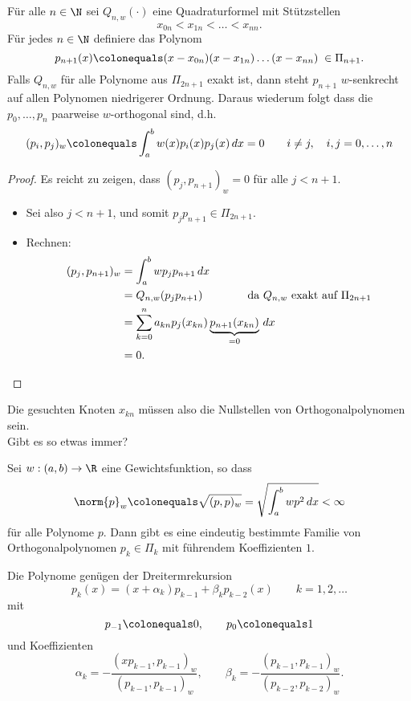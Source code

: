 \begin{lemma}
Für alle $n \in \N$ sei $Q_{n,w} (\cdot)$ eine Quadraturformel mit Stützstellen
\begin{equation*}
x_{0n} < x_{1n} < \dots < x_{nn}.
\end{equation*}
Für jedes $n \in \N$ definiere das Polynom
\begin{equation*}
p_{n+1}(x) \colonequals (x-x_{0n}) (x-x_{1n}) \dots (x-x_{nn}) \; \in \Pi_{n+1}.
\end{equation*}
Falls $Q_{n,w}$ für alle Polynome aus $\Pi_{2n+1}$ exakt ist, dann steht $p_{n+1}$
$w$-senkrecht auf allen Polynomen niedrigerer Ordnung.  Daraus wiederum folgt
dass  die $p_0, \dots, p_n$ paarweise $w$-orthogonal sind, d.h.
\begin{equation*}
(p_i,p_j)_w \colonequals \int_a^b w(x) p_i(x) p_j(x) \,dx = 0
\qquad
i \neq j, \quad  i,j = 0, \dots, n
\end{equation*}
\end{lemma}
\begin{proof}
Es reicht zu zeigen, dass $(p_j, p_{n+1})_w = 0$ für alle $j < n+1$.
\begin{itemize}
\item Sei also $j<n+1$, und somit $p_j p_{n+1} \in \Pi_{2n+1}$.
\item Rechnen:
\begin{align*}
(p_j, p_{n+1})_w
 & = \int_a^b w p_j p_{n+1}\,dx \\
 & = Q_{n,w} (p_j p_{n+1}) \qquad \qquad \textnormal{da $Q_{n,w}$ exakt auf $\Pi_{2n+1}$} \\
 & = \sum_{k=0}^n a_{kn}p_j(x_{kn})\underbrace{p_{n+1}(x_{kn})}_{= 0} \, dx \\
 & = 0.  \qedhere
\end{align*}
\end{itemize}
\end{proof}
Die gesuchten Knoten $x_{kn}$ müssen also die Nullstellen von Orthogonalpolynomen sein.
\\Gibt es so etwas immer?
\begin{satz}
Sei $w: (a,b) \to \R$ eine Gewichtsfunktion, so dass
\begin{equation*}
 \norm{p}_w
 \colonequals
 \sqrt{(p,p)_w}
 =
 \sqrt{ \int_a^b w p^2 \, dx} < \infty
\end{equation*}
für alle Polynome $p$. Dann gibt es eine eindeutig bestimmte Familie von Orthogonalpolynomen $p_k \in \Pi_k$ mit führendem Koeffizienten $1$.

Die Polynome genügen der Dreitermrekursion
\begin{equation*}
p_k(x) = (x + \alpha_k) p_{k-1} + \beta_k p_{k-2}(x) \qquad k = 1,2,\dots
\end{equation*}
mit
\begin{equation*}
p_{-1} \colonequals 0, \qquad p_0 \colonequals 1
\end{equation*}
und Koeffizienten
\begin{equation*}
\alpha_k = - \frac{(x p_{k-1}, p_{k-1})_w}{(p_{k-1}, p_{k-1})_w},
\qquad
\beta_k = - \frac{(p_{k-1}, p_{k-1})_w}{(p_{k-2}, p_{k-2})_w}.
\end{equation*}
\end{satz}

